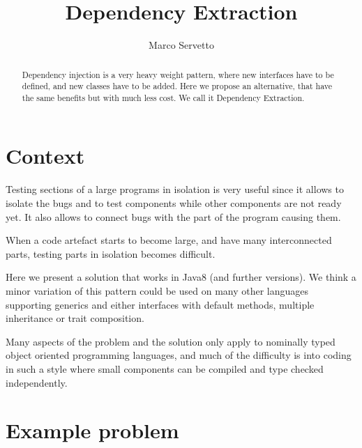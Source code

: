 \documentclass[submission,copyright,creativecommons]{eptcs}
\title{Dependency Extraction}
\author{Marco Servetto
\institute{ECS VUW\\ Wellington, New Zealand}
\institute{Engineering and Computer Science\\
Victoria University of Wellington}
\email{marco.servetto@ecs.vuw.ac.nz}
}
\begin{document}
\maketitle

\begin{abstract}
Dependency injection is a very heavy weight pattern,
where new interfaces have to be defined, and new classes
have to be added.
Here we propose an alternative, that have the same benefits
but with much less cost.
We call it Dependency Extraction.
\end{abstract}

\section{Context}
Testing sections of a large programs in isolation is very useful since it
allows to isolate the bugs and to test components while other components 
are not ready yet.
It also allows to connect bugs with the part of the program causing them.

When a code artefact starts to become large, and have many 
interconnected parts, testing parts in isolation becomes difficult.

Here we present a solution that works in Java8 (and further versions).
We think a minor variation of this pattern could be used on many other languages supporting generics and
either interfaces with default methods, multiple inheritance or trait composition.

Many aspects of the problem and the solution only apply to nominally typed object oriented programming languages, 
and much of the difficulty is into 
coding in such a style where small components 
can be compiled and type checked independently.

\section{Example problem}
\end{document}
